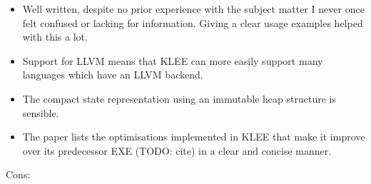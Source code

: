 \documentclass[11pt]{article}
\begin{document}
\begin{itemize}

    \item Well written, despite no prior experience with the subject matter I
    never once felt confused or lacking for information. Giving a clear usage
    examples helped with this a lot.

    \item Support for LLVM means that KLEE can more easily support many
    languages which have an LLVM backend.

    \item The compact state representation using an immutable heap structure
    is sensible.

    \item The paper lists the optimisations implemented in KLEE that make it
    improve over its predecessor EXE (TODO: cite) \cite{EXE} in a clear and
    concise manner.

\end{itemize}

Cons:
\end{document}
